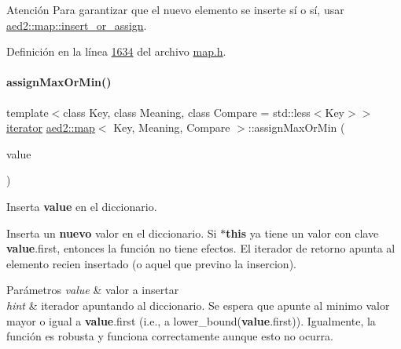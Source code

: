 \begin{DoxyAttention}{Atención}
Para garantizar que el nuevo elemento se inserte sí o sí, usar \hyperlink{classaed2_1_1map_a2ef6723c183916276b0afc4a4c721475_a2ef6723c183916276b0afc4a4c721475}{aed2\+::map\+::insert\+\_\+or\+\_\+assign}. 
\end{DoxyAttention}


Definición en la línea \hyperlink{map_8h_source_l01634}{1634} del archivo \hyperlink{map_8h_source}{map.\+h}.

\mbox{\label{classaed2_1_1map_a50aae07014200a53b95394f349f55948_a50aae07014200a53b95394f349f55948}} 
\paragraph{\texorpdfstring{assign\+Max\+Or\+Min()}{assignMaxOrMin()}}
{\footnotesize\ttfamily template$<$class Key, class Meaning, class Compare = std\+::less$<$\+Key$>$$>$ \\
\hyperlink{classaed2_1_1map_1_1iterator}{iterator} \hyperlink{classaed2_1_1map}{aed2\+::map}$<$ Key, Meaning, Compare $>$\+::assign\+Max\+Or\+Min (\begin{DoxyParamCaption}\item[{const \hyperlink{classaed2_1_1map_a719db98e0ff9a837610f76be33264680_a719db98e0ff9a837610f76be33264680}{value\+\_\+type} \&}]{value }\end{DoxyParamCaption})\hspace{0.3cm}{\ttfamily [inline]}}



Inserta {\bfseries value} en el diccionario. 

Inserta un {\bfseries nuevo} valor en el diccionario. Si {\bfseries $\ast$this} ya tiene un valor con clave {\bfseries value}.first, entonces la función no tiene efectos. El iterador de retorno apunta al elemento recien insertado (o aquel que previno la insercion).


\begin{DoxyParams}{Parámetros}
{\em value} & valor a insertar \\
\hline
{\em hint} & iterador apuntando al diccionario. Se espera que apunte al minimo valor mayor o igual a {\bfseries value}.first (i.\+e., a lower\+\_\+bound({\bfseries value}.first)). Igualmente, la función es robusta y funciona correctamente aunque esto no ocurra. \\
\hline
\end{DoxyParams}

